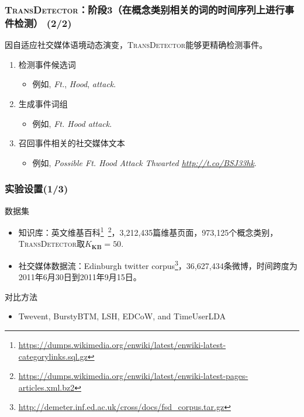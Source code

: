 \begin{frame}
\frametitle{\textsc{TransDetector}：阶段3（在概念类别相关的词的时间序列上进行事件检测） (2/2)}
因自适应社交媒体语境动态演变，\textsc{TransDetector}能够更精确检测事件。
\begin{enumerate}
	\item 检测事件候选词
	\begin{itemize}
		\item 例如, \textit{Ft.}, \textit{Hood}, \textit{attack}.
	\end{itemize}
	\item 生成事件词组
	\begin{itemize}
		\item 例如, \textit{Ft. Hood attack}.
	\end{itemize}
	\item 召回事件相关的社交媒体文本
	\begin{itemize}
		\item 例如, \textit{Possible Ft. Hood Attack Thwarted \url{http://t.co/BSJ33hk}}.
	\end{itemize}
\end{enumerate}
\end{frame}


\begin{frame}
\frametitle{实验设置(1/3)}
\noindent 数据集
\begin{itemize}
	\item 知识库：英文维基百科\footnote{\tiny{\url{https://dumps.wikimedia.org/enwiki/latest/enwiki-latest-categorylinks.sql.gz}}}\ \footnote{\tiny{\url{https://dumps.wikimedia.org/enwiki/latest/enwiki-latest-pages-articles.xml.bz2}}}，3,212,435篇维基页面，973,125个概念类别，\textsc{TransDetector}取$K_{\bm{KB}}=50$.
	\item 社交媒体数据流：Edinburgh twitter corpus\footnote{\tiny{\url{http://demeter.inf.ed.ac.uk/cross/docs/fsd_corpus.tar.gz}}}，36,627,434条微博，时间跨度为2011年6月30日到2011年9月15日。
\end{itemize} 
对比方法
\begin{itemize}
	\item Twevent, BurstyBTM, LSH, EDCoW, and TimeUserLDA
\end{itemize}
\end{frame}

